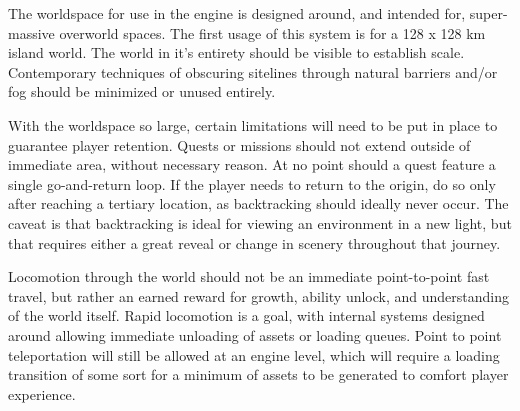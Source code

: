 The worldspace for use in the engine is designed around, and intended for, super-massive overworld spaces. The first usage of this system is for a 128 x 128 km island world. The world in it's entirety should be visible to establish scale. Contemporary techniques of obscuring sitelines through natural barriers and/or fog should be minimized or unused entirely.

With the worldspace so large, certain limitations will need to be put in place to guarantee player retention. Quests or missions should not extend outside of immediate area, without necessary reason. At no point should a quest feature a single go-and-return loop. If the player needs to return to the origin, do so only after reaching a tertiary location, as backtracking should ideally never occur. The caveat is that backtracking is ideal for viewing an environment in a new light, but that requires either a great reveal or change in scenery throughout that journey.

Locomotion through the world should not be an immediate point-to-point fast travel, but rather an earned reward for growth, ability unlock, and understanding of the world itself. Rapid locomotion is a goal, with internal systems designed around allowing immediate unloading of assets or loading queues. Point to point teleportation will still be allowed at an engine level, which will require a loading transition of some sort for a minimum of assets to be generated to comfort player experience.